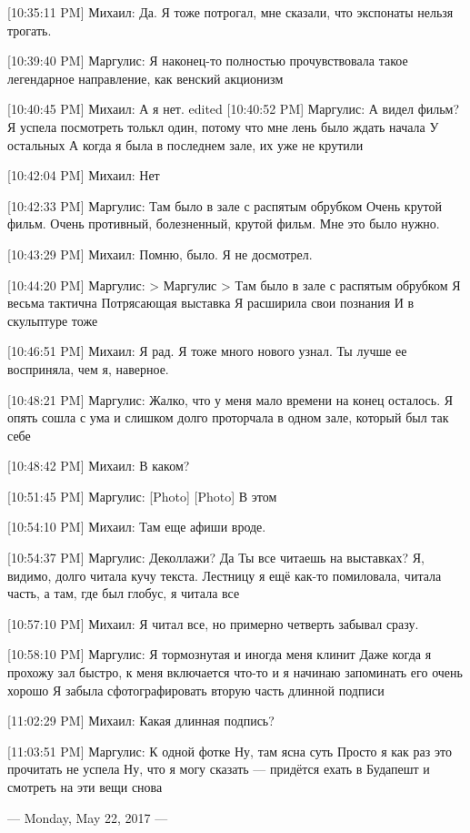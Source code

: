 \documentclass{article}
\begin{document}
{[10:35:11 PM] Михаил:
Да. Я тоже потрогал, мне сказали, что экспонаты нельзя трогать.

[10:39:40 PM] Маргулис:
Я наконец-то полностью прочувствовала такое легендарное направление, как венский акционизм

[10:40:45 PM] Михаил:
А я нет.
edited 
[10:40:52 PM] Маргулис:
А видел фильм?
 Я успела посмотреть толькл один, потому что мне лень было ждать начала
 У остальных
 А когда я была в последнем зале, их уже не крутили

[10:42:04 PM] Михаил:
Нет

[10:42:33 PM] Маргулис:
Там было в зале с распятым обрубком
 Очень крутой фильм. Очень противный, болезненный, крутой фильм. Мне это было нужно.

[10:43:29 PM] Михаил:
Помню, было. Я не досмотрел.

[10:44:20 PM] Маргулис:
> Маргулис
> Там было в зале с распятым обрубком
Я весьма тактична
 Потрясающая выставка
 Я расширила свои познания
 И в скульптуре тоже

[10:46:51 PM] Михаил:
Я рад. Я тоже много нового узнал. Ты лучше ее восприняла, чем я, наверное.

[10:48:21 PM] Маргулис:
Жалко, что у меня мало времени на конец осталось. Я опять сошла с ума и слишком долго проторчала в одном зале, который был так себе

[10:48:42 PM] Михаил:
В каком?

[10:51:45 PM] Маргулис:
[Photo]
 [Photo]
 В этом

[10:54:10 PM] Михаил:
Там еще афиши вроде.

[10:54:37 PM] Маргулис:
Деколлажи?
 Да
 Ты все читаешь на выставках?
 Я, видимо, долго читала кучу текста. Лестницу я ещё как-то помиловала, читала часть, а там, где был глобус, я читала все

[10:57:10 PM] Михаил:
Я читал все, но примерно четверть забывал сразу.

[10:58:10 PM] Маргулис:
Я тормознутая и иногда меня клинит
 Даже когда я прохожу зал быстро, к меня включается что-то и я начинаю запоминать его очень хорошо
 Я забыла сфотографировать вторую часть длинной подписи

[11:02:29 PM] Михаил:
Какая длинная подпись?

[11:03:51 PM] Маргулис:
К одной фотке
 Ну, там ясна суть
 Просто я как раз это прочитать не успела
 Ну, что я могу сказать — придётся ехать в Будапешт и смотреть на эти вещи снова

--- Monday, May 22, 2017 ---

}
\end{document}
